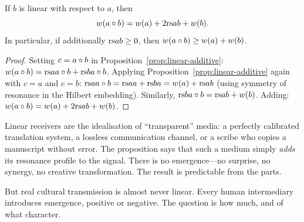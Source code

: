 \begin{corollary}
\label{cor:linear-weight}
If $b$ is linear with respect to $a$, then
\[
  w(a \circ b) = w(a) + 2\mathrm{rs}{a}{b} + w(b).
\]
In particular, if additionally $\mathrm{rs}{a}{b} \geq 0$, then $w(a \circ b) \geq w(a) + w(b)$.
\end{corollary}

\begin{proof}
Setting $c = a \circ b$ in Proposition~\ref{prop:linear-additive}:
$w(a \circ b) = \mathrm{rs}{a}{a \circ b} + \mathrm{rs}{b}{a \circ b}$.
Applying Proposition~\ref{prop:linear-additive} again with $c = a$ and
$c = b$:
$\mathrm{rs}{a}{a \circ b} = \mathrm{rs}{a}{a} + \mathrm{rs}{b}{a} = w(a) + \mathrm{rs}{a}{b}$
(using symmetry of resonance in the Hilbert embedding).
Similarly, $\mathrm{rs}{b}{a \circ b} = \mathrm{rs}{a}{b} + w(b)$.
Adding: $w(a \circ b) = w(a) + 2\mathrm{rs}{a}{b} + w(b)$.
\end{proof}

\begin{interpretation}
Linear receivers are the idealisation of ``transparent'' media: a perfectly
calibrated translation system, a lossless communication channel, or a scribe
who copies a manuscript without error.  The proposition says that such a
medium simply \emph{adds} its resonance profile to the signal.  There is no
emergence---no surprise, no synergy, no creative transformation.  The result
is predictable from the parts.

But real cultural transmission is almost never linear.  Every human
intermediary introduces emergence, positive or negative.  The question is
how much, and of what character.
\end{interpretation}

